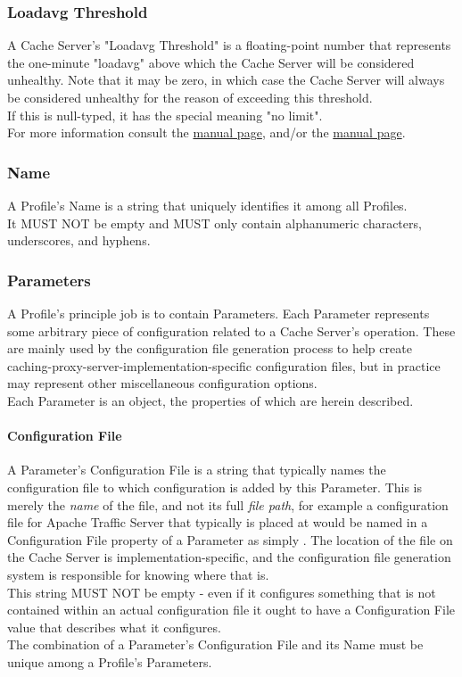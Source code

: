 \subsubsection{Loadavg Threshold}
A Cache Server's "Loadavg Threshold" is a floating-point number that represents
the one-minute "loadavg" above which the Cache Server will be considered
unhealthy. Note that it may be zero, in which case the Cache Server will always
be considered unhealthy for the reason of exceeding this threshold.\\
If this is null-typed, it has the special meaning "no limit".\\
For more information consult the
\href{https://linux.die.net/man/3/getloadavg}{ manual page},
and/or the
\href{https://linux.die.net/man/5/proc}{ manual page}.

\subsubsection{Name}
A Profile's Name is a string that uniquely identifies it among all Profiles.\\
It MUST NOT be empty and MUST only contain alphanumeric characters,
underscores, and hyphens.

\subsubsection{Parameters}
A Profile's principle job is to contain Parameters. Each Parameter represents
some arbitrary piece of configuration related to a Cache Server's operation.
These are mainly used by the configuration file generation process to help
create caching-proxy-server-implementation-specific configuration files, but in
practice may represent other miscellaneous configuration options.\\
Each Parameter is an object, the properties of which are herein described.

\paragraph{Configuration File}
A Parameter's Configuration File is a string that typically names the
configuration file to which configuration is added by this Parameter. This
is merely the \emph{name} of the file, and not its full \emph{file path}, for
example a configuration file for Apache Traffic Server that typically is placed
at  would be named in a Configuration
File property of a Parameter as simply . The location of
the file on the Cache Server is implementation-specific, and the configuration
file generation system is responsible for knowing where that is.\\
This string MUST NOT be empty - even if it configures something that is not
contained within an actual configuration file it ought to have a Configuration
File value that describes what it configures.\\
The combination of a Parameter's Configuration File and its Name must be unique
among a Profile's Parameters.

